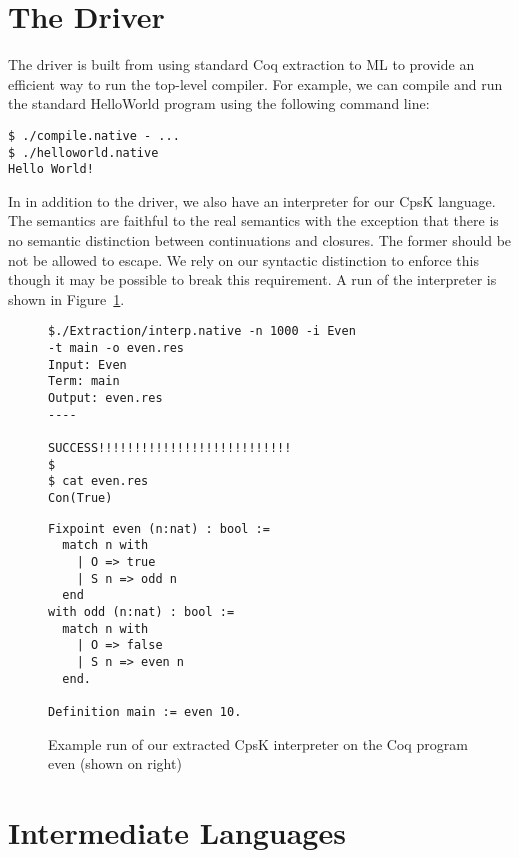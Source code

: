 \documentclass{article}
\begin{document}
\section{The Driver}
\label{sec:driver}

The driver is built from using standard Coq extraction to ML to provide an efficient way to run the top-level compiler. For example, we can compile and run the standard HelloWorld program using the following command line:

\begin{verbatim}
$ ./compile.native - ...
$ ./helloworld.native
Hello World!
\end{verbatim}

In in addition to the driver, we also have an interpreter for our CpsK language. The semantics are faithful to the real semantics with the exception that there is no semantic distinction between continuations and closures. The former should be not be allowed to escape. We rely on our syntactic distinction to enforce this though it may be possible to break this requirement. A run of the interpreter is shown in Figure~\ref{fig:interp}.

\begin{figure}
\centering
\vspace{10pt}
\begin{minipage}[t]{.55\textwidth}
\begin{verbatim}
$./Extraction/interp.native -n 1000 -i Even 
-t main -o even.res
Input: Even
Term: main
Output: even.res
----

SUCCESS!!!!!!!!!!!!!!!!!!!!!!!!!!!
$
$ cat even.res
Con(True)
\end{verbatim}
\end{minipage}
\begin{minipage}[t]{.3\textwidth}
\begin{lstlisting}
Fixpoint even (n:nat) : bool :=
  match n with
    | O => true
    | S n => odd n
  end
with odd (n:nat) : bool :=
  match n with
    | O => false
    | S n => even n
  end.

Definition main := even 10.
\end{lstlisting}
\end{minipage}
\caption{Example run of our extracted CpsK interpreter on the Coq program even (shown on right)}
\label{fig:interp}
\end{figure}

\section{Intermediate Languages}
\label{sec:il}
\end{document}
